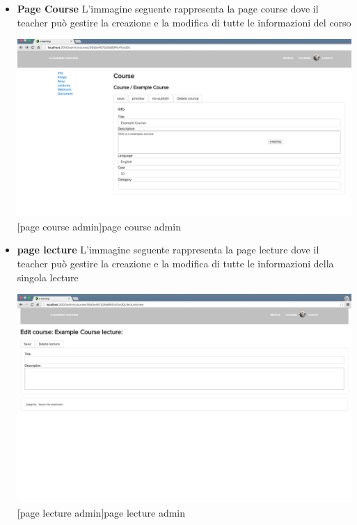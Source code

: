 \begin{itemize}
\item \textbf{Page Course} L'immagine seguente rappresenta la page course dove il teacher può gestire la creazione e la modifica di tutte le informazioni del corso\par

\begin{minipage}{\linewidth}
    \centering
    \includegraphics[width=1.0\linewidth]{images/chapter4/page-course-admin.png}
    [page course admin]{page course admin}
\end{minipage}

\item \textbf{page lecture} L'immagine seguente rappresenta la page lecture dove il teacher può gestire la creazione e la modifica di tutte le informazioni della singola lecture\par

\begin{minipage}{\linewidth}
    \centering
    \includegraphics[width=1.0\linewidth]{images/chapter4/page-lecture-admin.png}
    [page lecture admin]{page lecture admin}
\end{minipage}


\end{itemize}
